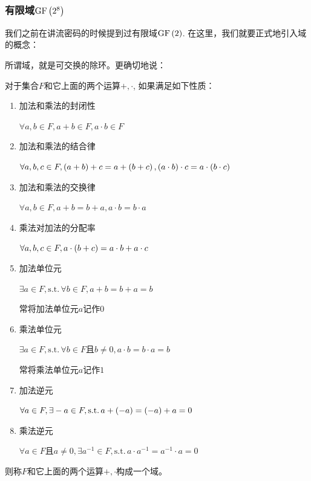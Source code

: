 \subsubsection{有限域$\mathrm{GF}\left( {2^8}\right)$}
我们之前在讲流密码的时候提到过有限域$\mathrm{GF}\left( {2}\right)$. 在这里，我们就要正式地引入域的概念：\par
所谓域，就是可交换的除环。更确切地说：
\begin{Definition}
对于集合$F$和它上面的两个运算$+, \cdot$, 如果满足如下性质：
\begin{enumerate}
    \item 加法和乘法的封闭性\par
    $\forall a, b\in F, a+b\in F, a\cdot b\in F$
    \item 加法和乘法的结合律\par
    $\forall a, b, c\in F, \left( {a+b}\right)+c=a+\left( {b+c}\right), \left( {a\cdot b}\right)\cdot c=a\cdot\left( {b\cdot c}\right)$
    \item 加法和乘法的交换律\par
    $\forall a, b\in F, a+b=b+a, a\cdot b=b\cdot a$
    \item 乘法对加法的分配率\par
    $\forall a, b, c\in F, a\cdot\left( {b+c}\right)=a\cdot b+a\cdot c$
    \item 加法单位元\par
    $\exists a\in F, \mathrm{s.t.}\, \forall b\in F, a+b=b+a=b$\par
    常将加法单位元$a$记作$0$
    \item 乘法单位元\par
    $\exists a\in F, \mathrm{s.t.}\, \forall b\in F\text{且}b\neq 0, a\cdot b=b\cdot a=b$\par
    常将乘法单位元$a$记作$1$
    \item 加法逆元\par
    $\forall a\in F,\exists -a\in F, \mathrm{s.t.}\, a+\left( {-a}\right)=\left( {-a}\right)+a=0$
    \item 乘法逆元\par
    $\forall a\in F\text{且}a\neq 0, \exists a^{-1}\in F, \mathrm{s.t.}\, a\cdot a^{-1}=a^{-1}\cdot a=0$
\end{enumerate}
则称$F$和它上面的两个运算$+, \cdot$构成一个域。
\end{Definition}

